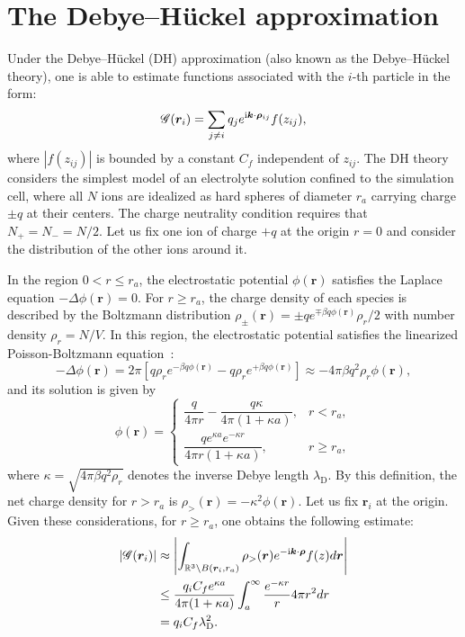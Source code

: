 \section{The Debye--H\"uckel approximation}\label{app::Debye}
Under the Debye--H\"uckel (DH) approximation (also known as the Debye--H\"uckel theory), one is able to estimate functions associated with the $i$-th particle in the form:
\begin{equation}
	\mathscr{G}(\bm{r}_i)=\sum_{j\neq i}q_{j}e^{\mathrm{i} \bm{k}\cdot\bm{\rho}_{ij}}f(z_{ij}),
\end{equation}
where $|f(z_{ij})|$ is bounded by a constant $C_f$ independent of $z_{ij}$. The DH theory considers the simplest model of an electrolyte solution confined to the simulation cell, where all $N$ ions are idealized as hard spheres of diameter $r_{a}$ carrying charge $\pm q$ at their centers. The charge neutrality condition requires that $N_+=N_-=N/2$. Let us fix one ion of charge $+q$ at the origin $r=0$ and consider the distribution of the other ions around it.

In the region $0<r\leq r_{a}$, the electrostatic potential $\phi(\bm{r})$ satisfies the Laplace equation $-\Delta\phi(\bm{r})=0$. For $r\geq r_{a}$, the charge density of each species is described by the Boltzmann distribution $\rho_{\pm}(\bm{r})=\pm qe^{\mp\beta q\phi(\bm{r})}\rho_r/2$ with number density $\rho_r=N/V$. In this region, the electrostatic potential satisfies the linearized Poisson-Boltzmann equation~\cite{levin2002electrostatic}:
\begin{equation}
	-\Delta \phi(\bm{r})=2\pi\left[q \rho_r e^{-\beta q\phi(\bm{r})}-q\rho_r e^{+\beta q\phi(\bm{r})}\right]\approx -4\pi \beta q^2\rho_r\phi(\bm{r}),
\end{equation}
and its solution is given by
\begin{equation}
	\phi(\bm{r})=\begin{cases}
		\dfrac{q}{4\pi r}-\dfrac{q\kappa}{4\pi (1+\kappa a)},& r<r_{a},\\[1em]
		\dfrac{qe^{\kappa a}e^{-\kappa r}}{4\pi r(1+\kappa a)},&r\geq r_{a},
	\end{cases}
\end{equation}
where $\kappa=\sqrt{4\pi\beta q^2\rho_r}$ denotes the inverse Debye length $\lambda_{\text{D}}$. By this definition, the net charge density for $r>r_{a}$ is $\rho_>(\bm{r})=-\kappa^2\phi(\bm{r})$. Let us fix $\bm{r}_i$ at the origin. Given these considerations, for $r\geq r_a$, one obtains the following estimate:
\begin{equation}\label{eq::E.4}
	\begin{split}
		|\mathscr{G}(\bm{r}_i)|&\approx \left|\int_{\mathbb{R}^3\backslash B(\bm{r}_{i}, r_a)}\rho_>(\bm{r})e^{-\mathrm{i} \bm{k}\cdot\bm{\rho}}f(z)d\bm{r}\right|\\
		&\leq \frac{q_iC_fe^{\kappa a}}{4\pi(1+\kappa a)}\int_{a}^{\infty}\frac{e^{-\kappa r}}{r}4\pi r^2dr\\
		&=q_iC_f\lambda_{\text{D}}^2.
	\end{split}
\end{equation}

